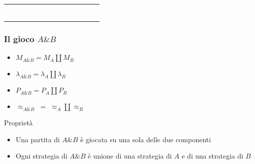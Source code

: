 \documentclass{beamer}
\begin{document}
\begin{frame}[t]
	
	\begin{tabular}{c c}
		
		
		&
		
		\\
		
		\begin{minipage}{0.48\textwidth}
			\begin{figure}[t]
				\Large
				\centering
				\def\svgwidth{0.6\textwidth}
				
			\end{figure}
		\end{minipage} &  \begin{minipage}{0.48\textwidth}
			\begin{figure}[t]
				\Large
				\centering
				\def\svgwidth{0.6\textwidth}
				
			\end{figure}
		\end{minipage} \\
		
		
		&
		
		
	\end{tabular}
	

	
\end{frame}




\begin{frame}
	
	\frametitle{Il gioco $A \& B$}
	
	\begin{itemize}
		\item $M_{A\& B}=M_A \coprod M_B$
		\item $\lambda_{A\& B}=\lambda_A \coprod \lambda_B$
		\item $P_{A\& B}=P_A \coprod P_B$
		\item $\approx_{A\& B} \; = \; \approx_A \coprod \approx_B$ 
	\end{itemize}
	
	\begin{block}{Proprietà}
		\begin{itemize}
			\item Una partita di $A\& B$ è giocata su una sola delle due componenti
			\item Ogni strategia di $A\& B$ è unione di una strategia di $A$ e di una strategia di $B$
		\end{itemize}
		
	\end{block}
	
\end{frame}
\end{document}
